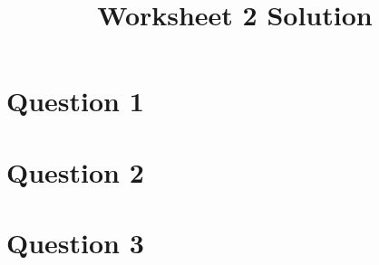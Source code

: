 \documentclass[12pt]{article}
\begin{document}
\title{Worksheet 2 Solution}
\maketitle

\section*{Question 1}

\section*{Question 2}

\section*{Question 3}
\end{document}
